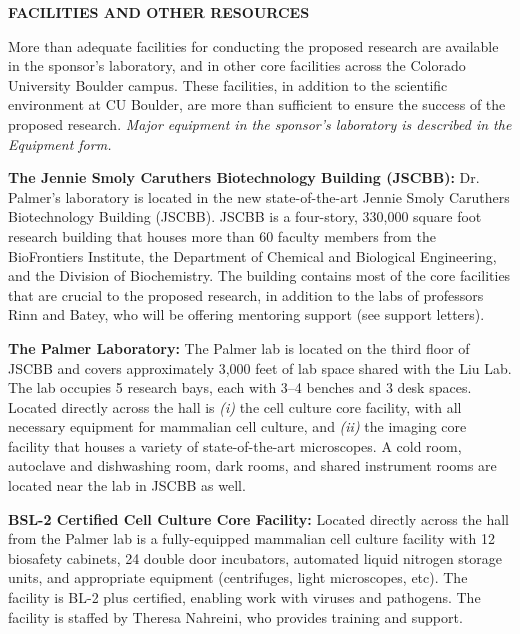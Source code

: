 


\begin{center}
\bf FACILITIES AND OTHER RESOURCES
\end{center}
More than adequate facilities for conducting the proposed research are available in the sponsor's laboratory, and in other core facilities across the Colorado University Boulder campus. These facilities, in addition to the scientific environment at CU Boulder, are more than sufficient to ensure the success of the proposed research. \textit{Major equipment in the sponsor's laboratory is described in the Equipment form.}

  {\bf The Jennie Smoly Caruthers Biotechnology Building (JSCBB):} Dr. Palmer’s laboratory is located in the new state-of-the-art Jennie Smoly Caruthers Biotechnology Building (JSCBB). JSCBB is a four-story, 330,000 square foot research building that houses more than 60 faculty members from the BioFrontiers Institute, the Department of Chemical and Biological Engineering, and the Division of Biochemistry. The building contains most of the core facilities that are crucial to the proposed research, in addition to the labs of professors Rinn and Batey, who will be offering mentoring support (see support letters).

  {\bf The Palmer Laboratory:} The Palmer lab is located on the third floor of JSCBB and covers approximately 3,000 feet of lab space shared with the Liu Lab. The lab occupies 5 research bays, each with 3--4 benches and 3 desk spaces. Located directly across the hall is \textit{(i)} the cell culture core facility, with all necessary equipment for mammalian cell culture, and \textit{(ii)} the imaging core facility that houses a variety of state-of-the-art microscopes. A cold room, autoclave and dishwashing room, dark rooms, and shared instrument rooms are located near the lab in JSCBB as well.

  {\bf BSL-2 Certified Cell Culture Core Facility:} Located directly across the hall from the Palmer lab is a fully-equipped mammalian cell culture facility with 12 biosafety cabinets, 24 double door incubators, automated liquid nitrogen storage units, and appropriate equipment (centrifuges, light microscopes, etc). The facility is BL-2 plus certified, enabling work with viruses and pathogens. The facility is staffed by Theresa Nahreini, who provides training and support.


